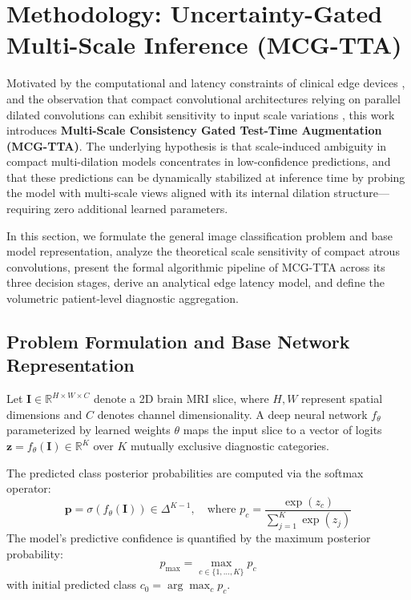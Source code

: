 \section{Methodology: Uncertainty-Gated Multi-Scale Inference (MCG-TTA)}

Motivated by the computational and latency constraints of clinical edge devices \cite{12, 25, 26}, and the observation that compact convolutional architectures relying on parallel dilated convolutions can exhibit sensitivity to input scale variations \cite{5, 21}, this work introduces \textbf{Multi-Scale Consistency Gated Test-Time Augmentation (MCG-TTA)}. The underlying hypothesis is that scale-induced ambiguity in compact multi-dilation models concentrates in low-confidence predictions, and that these predictions can be dynamically stabilized at inference time by probing the model with multi-scale views aligned with its internal dilation structure---requiring zero additional learned parameters.

In this section, we formulate the general image classification problem and base model representation, analyze the theoretical scale sensitivity of compact atrous convolutions, present the formal algorithmic pipeline of MCG-TTA across its three decision stages, derive an analytical edge latency model, and define the volumetric patient-level diagnostic aggregation.

\subsection{Problem Formulation and Base Network Representation}

Let $\mathbf{I} \in \mathbb{R}^{H \times W \times C}$ denote a 2D brain MRI slice, where $H, W$ represent spatial dimensions and $C$ denotes channel dimensionality. A deep neural network $f_\theta$ parameterized by learned weights $\theta$ maps the input slice to a vector of logits $\mathbf{z} = f_\theta(\mathbf{I}) \in \mathbb{R}^K$ over $K$ mutually exclusive diagnostic categories. 

The predicted class posterior probabilities are computed via the softmax operator:
\begin{equation}
\mathbf{p} = \sigma\left(f_\theta(\mathbf{I})\right) \in \Delta^{K-1}, \quad \text{where } p_c = \frac{\exp(z_c)}{\sum_{j=1}^K \exp(z_j)}
\label{eq:softmax}
\end{equation}
The model's predictive confidence is quantified by the maximum posterior probability:
\begin{equation}
p_{\max} = \max_{c \in \{1, \dots, K\}} p_c
\end{equation}
with initial predicted class $c_0 = \arg\max_c p_c$.

